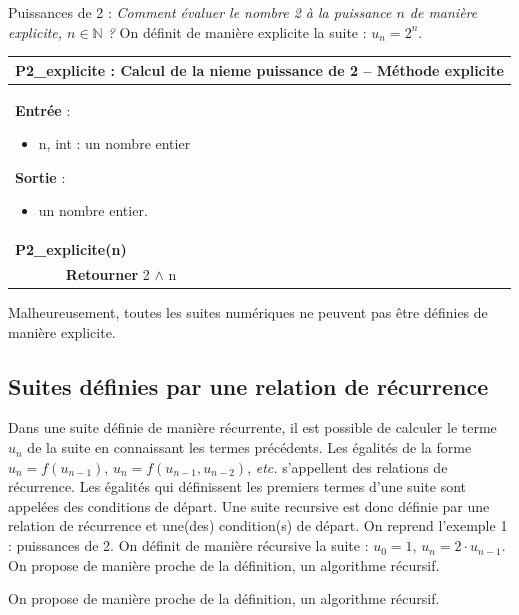 \documentclass[10pt,fleqn]{article} %
\newcommand{\bfsf}[1]{\textbf{{#1}}}%
\begin{document}
\begin{exemple}
Puissances de 2 : \textit{Comment évaluer le nombre 2 à la puissance $n$ de manière explicite, $n\in \mathbb{N}$ ?}
On définit de manière explicite la suite :  $u_n=2^n$.

\begin{pseudo}
\begin{tabular}{p{.5cm}p{10cm}}
\hline
\multicolumn{2}{l}{ \textbf{P2\_explicite} : Calcul de la nieme puissance de 2 -- Méthode explicite} \\
\hline
\multicolumn{2}{p{11cm}}{
\textbf{Entrée} : 
\begin{itemize}
\item n, int  : un nombre entier
\end{itemize}
\textbf{Sortie} : 
\begin{itemize}
\item un nombre entier.
\end{itemize}}\\
\multicolumn{2}{l}{\bfsf{P2\_explicite(n)}} : \\
& \bfsf{Retourner} 2 $\wedge$ n\\
\hline
\end{tabular}
\end{pseudo}
\end{exemple}
Malheureusement, toutes les suites numériques ne peuvent pas être définies de manière explicite.

\subsection{Suites définies par une relation de récurrence}
Dans une suite définie de manière récurrente, il est possible de calculer le terme $u_n$ de la suite en connaissant les termes précédents.
Les égalités de la forme $u_n = f (u_{n-1})$, $u_n = f (u_{n-1}, u_{n-2})$, \textit{etc.} s’appellent des relations de récurrence.
Les égalités qui définissent les premiers termes d’une suite sont appelées des conditions de départ.
Une suite recursive est donc définie par une relation de récurrence et une(des) condition(s) de départ.
On reprend l’exemple 1 : puissances de 2.
On définit de manière récursive la suite : $u_0=1$, $u_n = 2\cdot u_{n-1}$.
On propose de manière proche de la définition, un algorithme récursif.

On propose de manière proche de la définition, un algorithme récursif.
\end{document}
